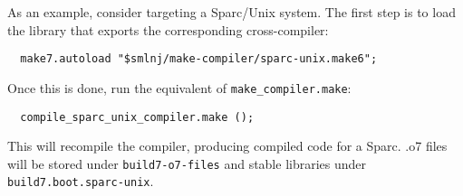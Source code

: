 As an example, consider targeting a Sparc/Unix system.  The first step
is to load the library that exports the corresponding cross-compiler:

\begin{verbatim}
  make7.autoload "$smlnj/make-compiler/sparc-unix.make6";
\end{verbatim}

Once this is done, run the equivalent of {\tt make_compiler.make}:

\begin{verbatim}
  compile_sparc_unix_compiler.make ();
\end{verbatim}

This will recompile the compiler, producing compiled code for a Sparc.
.o7 files will be stored under {\tt build7-o7-files} and stable
libraries under {\tt build7.boot.sparc-unix}.
